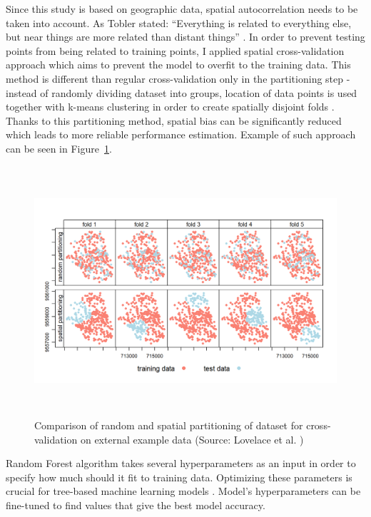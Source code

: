 \documentclass{amuthesis}
\begin{document}
Since this study is based on geographic data, spatial autocorrelation
needs to be taken into account. As Tobler stated: ``Everything is
related to everything else, but near things are more related than
distant things'' \autocite{tobler_computer_1970}. In order to prevent
testing points from being related to training points, I applied spatial
cross-validation approach which aims to prevent the model to overfit to
the training data. This method is different than regular
cross-validation only in the partitioning step - instead of randomly
dividing dataset into groups, location of data points is used together
with k-means clustering \autocite{brenning_spatial_2012} in order to
create spatially disjoint folds \autocite{lovelace_geocomputation_2019}.
Thanks to this partitioning method, spatial bias can be significantly
reduced which leads to more reliable performance estimation. Example of
such approach can be seen in Figure~\ref{fig-rycina5}.

\begin{figure}[H]

{\centering \includegraphics[width=5.9375in,height=3.64583in]{./figures/spatial_partitioning.png}

}

\caption{\label{fig-rycina5}Comparison of random and spatial
partitioning of dataset for cross-validation on external example data
(Source: Lovelace et al. \autocite*{lovelace_geocomputation_2019})}

\end{figure}

Random Forest algorithm takes several hyperparameters as an input in
order to specify how much should it fit to training data. Optimizing
these parameters is crucial for tree-based machine learning models
\autocite{yang_hyperparameter_2020}. Model's hyperparameters can be
fine-tuned to find values that give the best model accuracy.
\end{document}

